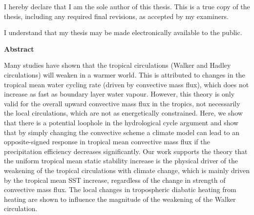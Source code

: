 \cleardoublepage %
 


  \noindent
I hereby declare that I am the sole author of this thesis. This is a true copy of the thesis, including any required final revisions, as accepted by my examiners.

  \bigskip
  
  \noindent
I understand that my thesis may be made electronically available to the public.

\cleardoublepage


\begin{center}\textbf{Abstract}\end{center}

Many studies have shown that the tropical circulations (Walker and Hadley circulations) will weaken in a warmer world. This is attributed to changes in the tropical mean water cycling rate (driven by convective mass flux), which does not increase as fast as boundary layer water vapour. However, this theory is only valid for the overall upward convective mass flux in the tropics, not necessarily the local circulations, which are not as energetically constrained. Here, we show that there is a potential loophole in the hydrological cycle argument and show that by simply changing the convective scheme a climate model can lead to an opposite-signed response in tropical mean convective mass flux if the precipitation efficiency decreases significantly. Our work supports the theory that the uniform tropical mean static stability increase is the physical driver of the weakening of the tropical circulations with climate change, which is mainly driven by the tropical mean SST increase, regardless of the change in strength of convective mass flux. The local changes in tropospheric diabatic heating from heating are shown to influence the magnitude of the weakening of the Walker circulation.

